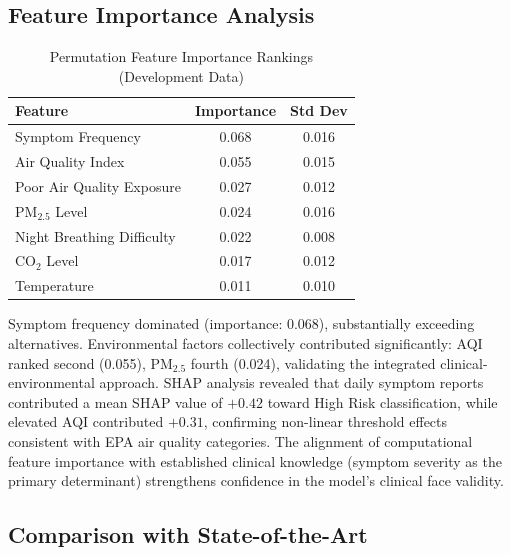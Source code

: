 \documentclass[11pt,a4paper]{article}
\begin{document}
\subsection{Feature Importance Analysis}

\begin{table}[H]
\centering
\caption{Permutation Feature Importance Rankings (Development Data)}
\label{tab:features}
\begin{tabular}{lcc}
\toprule
\textbf{Feature} & \textbf{Importance} & \textbf{Std Dev} \\
\midrule
Symptom Frequency        & 0.068 & 0.016 \\
Air Quality Index        & 0.055 & 0.015 \\
Poor Air Quality Exposure & 0.027 & 0.012 \\
PM$_{2.5}$ Level         & 0.024 & 0.016 \\
Night Breathing Difficulty & 0.022 & 0.008 \\
CO$_2$ Level             & 0.017 & 0.012 \\
Temperature              & 0.011 & 0.010 \\
\bottomrule
\end{tabular}
\end{table}

Symptom frequency dominated (importance: 0.068), substantially exceeding alternatives.
Environmental factors collectively contributed significantly: AQI ranked second (0.055),
PM$_{2.5}$ fourth (0.024), validating the integrated clinical-environmental approach.
SHAP analysis \cite{lundberg2017} revealed that daily symptom reports contributed a mean
SHAP value of $+0.42$ toward High Risk classification, while elevated AQI contributed
$+0.31$, confirming non-linear threshold effects consistent with EPA air quality
categories. The alignment of computational feature importance with established clinical
knowledge (symptom severity as the primary determinant) strengthens confidence in the
model's clinical face validity.

\subsection{Comparison with State-of-the-Art}
\end{document}
